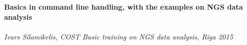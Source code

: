 \documentclass{article}
\begin{document}
  \begin{center}
  \Large\textbf{Basics in command line handling, with the examples on NGS data analysis}\\~\\
  \large\textit{Ivars Silamikelis, COST Basic training on NGS data analysis, Riga 2015}
  \end{center}
%
  
  
  
  
  
\end{document}
